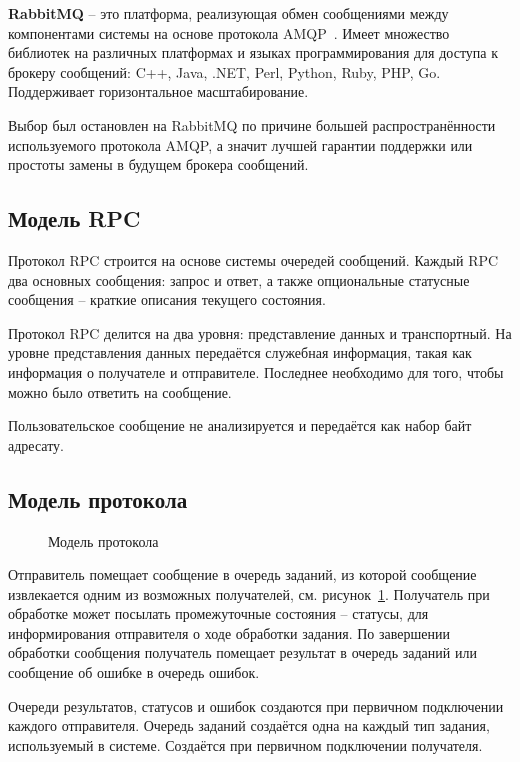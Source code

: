 \textbf{RabbitMQ} -- это платформа, реализующая обмен сообщениями между
компонентами системы на основе протокола AMQP~\cite{amqp}.
Имеет множество библиотек на различных платформах и языках программирования
для доступа к брокеру сообщений: C++, Java, .NET, Perl, Python, Ruby, PHP, Go.
Поддерживает горизонтальное масштабирование.

Выбор был остановлен на RabbitMQ по причине большей распространённости
используемого протокола AMQP, а значит лучшей гарантии поддержки или
простоты замены в будущем брокера сообщений.

\subsection{Модель RPC} %
Протокол RPC строится на основе системы очередей сообщений.
Каждый RPC два основных сообщения: запрос и ответ, а также опциональные
статусные сообщения -- краткие описания текущего состояния.

Протокол RPC делится на два уровня: представление данных и транспортный.
На уровне представления данных передаётся служебная информация, такая как
информация о получателе и отправителе. Последнее необходимо для того,
чтобы можно было ответить на сообщение.

Пользовательское сообщение не анализируется и передаётся как набор байт адресату.

\subsection{Модель протокола}
\begin{figure}[H]
    \centering
    
    \caption{Модель протокола}
    \label{fig:brokerproto}
\end{figure}

Отправитель помещает сообщение в очередь заданий, из которой сообщение
извлекается одним из возможных получателей, см. рисунок~\ref{fig:brokerproto}.
Получатель при обработке может посылать промежуточные состояния -- статусы,
для информирования отправителя о ходе обработки задания. По завершении
обработки сообщения получатель помещает результат в очередь заданий
или сообщение об ошибке в очередь ошибок.

Очереди результатов, статусов и ошибок создаются при первичном подключении
каждого отправителя. Очередь заданий создаётся одна на каждый тип задания,
используемый в системе. Создаётся при первичном подключении получателя.

